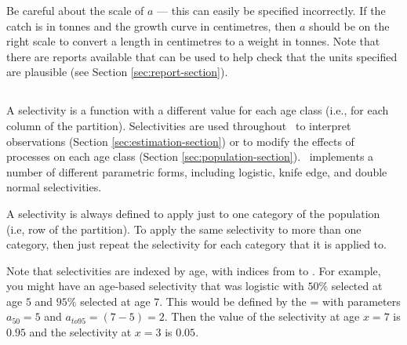 Be careful about the scale of $a$ --- this can easily be specified incorrectly. If the catch is in tonnes and the growth curve in centimetres, then $a$ should be on the right scale to convert a length in centimetres to a weight in tonnes. Note that there are reports available that can be used to help check that the units specified are plausible (see Section \ref{sec:report-section}).


\subsubsection*{}

\subsection{\label{sec:weightless-model}}

\subsection{\label{sec:maturity-notinpartition}}

\newpage

\subsection{\label{sec:selectivities}}

A selectivity is a function with a different value for each age class (i.e., for each column of the partition). Selectivities are used throughout \CAS\ to interpret observations (Section \ref{sec:estimation-section}) or to modify the effects of processes on each age class (Section \ref{sec:population-section}). \CAS\ implements a number of different parametric forms, including logistic, knife edge, and double normal selectivities.

A selectivity is always defined to apply just to one category of the population (i.e, row of the partition). To apply the same selectivity to more than one category, then just repeat the selectivity for each category that it is applied to.

Note that selectivities are indexed by age, with indices from  to . For example, you might have an age-based selectivity that was logistic with $50\%$ selected at age $5$ and $95\%$ selected at age $7$. This would be defined by the = with parameters $a_{50}=5$ and $a_{to95}=(7-5)=2$. Then the value of the selectivity at age $x=7$ is $0.95$ and the selectivity at $x=3$ is $0.05$.

